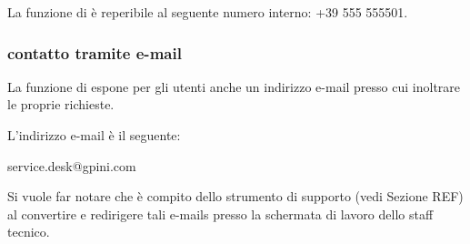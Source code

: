 La funzione di  è reperibile al seguente numero interno: +39 555 555501.

\subsubsection[Contatto tramite e-mail]{contatto tramite e-mail}
La funzione di  espone per gli utenti anche un indirizzo e-mail presso cui inoltrare le proprie richieste.

L'indirizzo e-mail è il seguente:

\begin{center}
service.desk@gpini.com
\end{center}

Si vuole far notare che è compito dello strumento di supporto (vedi Sezione REF) al  convertire e redirigere tali e-mails presso la schermata di lavoro dello staff tecnico.